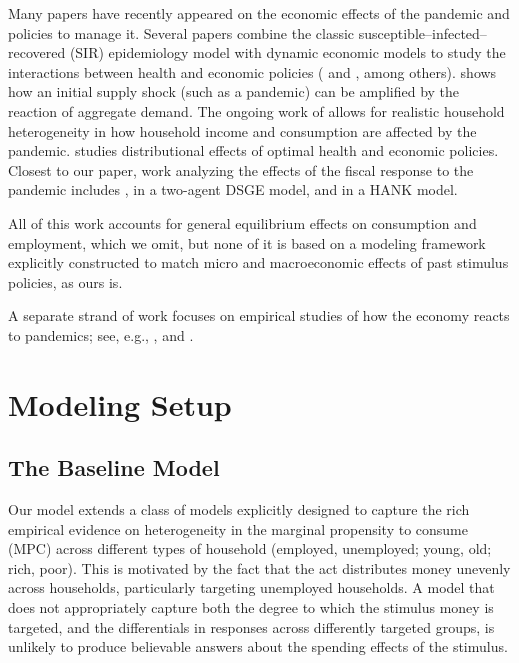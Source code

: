 \documentclass[titlepage]{\econtex}
\begin{document}
Many papers have recently appeared on the economic effects of the pandemic and policies to manage it.
Several papers combine the classic susceptible--infected--recovered (SIR) epidemiology model with dynamic economic models to study the interactions between health and economic policies (\cite{ert_covid} and \cite{aal_covid}, among others).
\cite{covidMacroImpl} shows how an initial supply shock (such as a pandemic) can be amplified by the reaction of aggregate demand.  
The ongoing work of \cite{kmv_pandemics} allows for realistic household heterogeneity in how household income and consumption are affected by the pandemic.
\cite{healthWealth} studies distributional effects of optimal health and economic policies.
Closest to our paper, work analyzing the effects of the fiscal response to the pandemic includes \cite{faria_FPpandemic}, in a two-agent DSGE model, and \cite{bayer_corona} in a HANK model.

All of this work accounts for general equilibrium effects on consumption and employment, which we omit, but none of it is based on a modeling framework explicitly constructed to match micro and macroeconomic effects of past stimulus policies, as ours is.

A separate strand of work focuses on empirical studies of how the economy reacts to pandemics; see, e.g., \cite{baker_Cpandemic}, \cite{jorda_pandemics} and \cite{verner_pandemics}.

\section{Modeling Setup}

\subsection{The Baseline Model}

Our model extends a class of models explicitly designed to capture the rich empirical evidence on heterogeneity in the marginal propensity to consume (MPC) across different types of household (employed, unemployed; young, old; rich, poor).  This is motivated by the fact that the act distributes money unevenly across households, particularly targeting unemployed households.  A model that does not appropriately capture both the degree to which the stimulus money is targeted, and the differentials in responses across differently targeted groups, is unlikely to produce believable answers about the spending effects of the stimulus.
\end{document}
